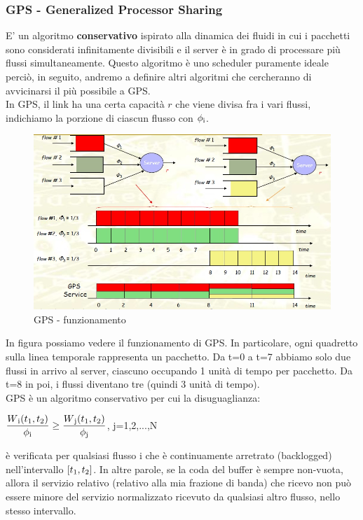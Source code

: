 \documentclass{article}
\begin{document}
\subsubsection{GPS - Generalized Processor Sharing}
E' un algoritmo \textbf{conservativo} ispirato alla dinamica dei fluidi in cui i pacchetti sono considerati infinitamente divisibili e il server è in grado di processare più flussi simultaneamente. Questo algoritmo è uno scheduler puramente ideale perciò, in seguito, andremo a definire altri algoritmi che cercheranno di avvicinarsi il più possibile a GPS. \\
In GPS, il link ha una certa capacità \( r\) che viene divisa fra i vari flussi, indichiamo la porzione di ciascun flusso con \( \phi\textsubscript{i} \).\\
\begin{figure}[H]
    \centering
    \includegraphics[scale=0.5]{figures/gps.jpg}
    \caption{GPS - funzionamento}
\end{figure}
In figura possiamo vedere il funzionamento di GPS. In particolare, ogni quadretto sulla linea temporale rappresenta un pacchetto. Da t=0 a t=7 abbiamo solo due flussi in arrivo al server, ciascuno occupando 1 unità di tempo per pacchetto. Da t=8 in poi, i flussi diventano tre (quindi 3 unità di tempo).\\
GPS è un algoritmo conservativo per cui la disuguaglianza:\\
\begin{center}
\( \displaystyle \frac{W\textsubscript{i}(t\textsubscript{1}, t\textsubscript{2})}{\phi\textsubscript{i}} \geq \frac{W\textsubscript{j}(t\textsubscript{1}, t\textsubscript{2})}{\phi\textsubscript{j}}\), j=1,2,...,N
\end{center}
è verificata per qualsiasi flusso i che è continuamente arretrato (backlogged) nell'intervallo \( [t\textsubscript{1}, t\textsubscript{2}] \). In altre parole, se la coda del buffer è sempre non-vuota, allora il servizio relativo (relativo alla mia frazione di banda) che ricevo non può essere minore del servizio normalizzato ricevuto da qualsiasi altro flusso, nello stesso intervallo.
\end{document}
